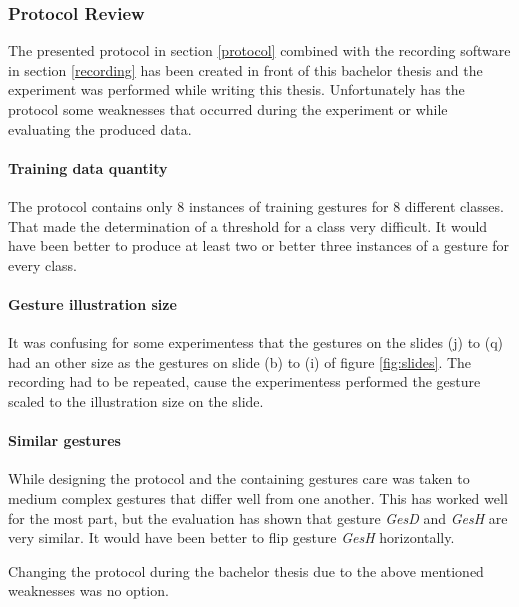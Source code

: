 \subsubsection{Protocol Review} \label{protocol_review}
The presented protocol in section \ref{protocol} combined with the recording software in section \ref{recording} has
been created in front of this bachelor thesis and the experiment was performed while writing this thesis. Unfortunately
has the protocol some weaknesses that occurred during the experiment or while evaluating the produced data.

\paragraph{Training data quantity} The protocol contains only 8 instances of training gestures for 8 different classes.
That made the determination of a threshold for a class very difficult. It would have been better to produce at least two
or better three instances of a gesture for every class.

\paragraph{Gesture illustration size} It was confusing for some experimentess that the gestures on the slides (j) to (q)
had an other size as the gestures on slide (b) to (i) of figure \ref{fig:slides}. The recording had to be repeated,
cause the experimentess performed the gesture scaled to the illustration size on the slide.

\paragraph{Similar gestures} While designing the protocol and the containing gestures care was taken to medium complex
gestures that differ well from one another. This has worked well for the most part, but the evaluation has shown that
gesture \textit{GesD} and \textit{GesH} are very similar. It would have been better to flip gesture \textit{GesH}
horizontally.

Changing the protocol during the bachelor thesis due to the above mentioned weaknesses was no option.
